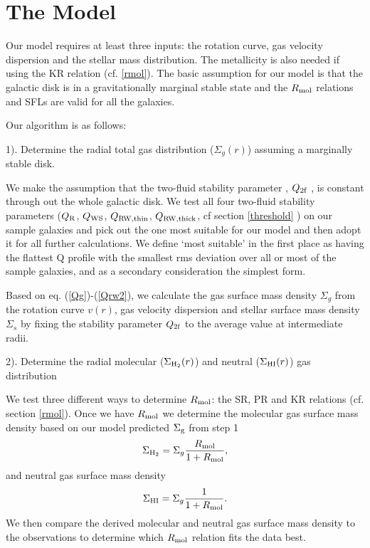 \documentclass[12pt,preprint]{aastex}
\begin{document}
\section{The Model}
\label{model}

Our model requires at least three inputs: the rotation curve, gas velocity dispersion and the stellar mass distribution. The metallicity is also needed if using the KR relation (cf. \ref{rmol}).  
 The basic assumption for our model is that the  galactic disk is in a gravitationally marginal stable state and the $R_{\rm mol}$ relations and SFLs are valid for all the galaxies.


 


Our algorithm is as follows:

1). Determine the radial total gas distribution  ($\Sigma_g(r)$) assuming a marginally stable disk.

We make the assumption that the two-fluid stability parameter 
, $  Q_{\rm 2f}$ , 
is constant through out the whole galactic disk. We test all  four two-fluid stability parameters ($Q_{\rm R}$, $Q_{\rm WS}$, $Q_{\rm RW,thin}$, $Q_{\rm RW,thick}$, 
 cf section \ref{threshold}
) on  our sample galaxies and pick out the one most suitable for our model and then adopt it for all further calculations. We define `most suitable' in the first place as having the flattest Q profile with the smallest rms deviation over all or most of the sample galaxies, and as a secondary consideration the simplest form.

Based on eq. (\ref{Qg})-(\ref{Qrw2}), we  calculate the gas surface mass density $\Sigma_g$ from the rotation curve $v(r)$, gas velocity dispersion and stellar surface mass density $\Sigma_s$ by fixing the stability parameter $Q_{\rm 2f}$ to the average value at intermediate radii. 


2). Determine the radial molecular ($\Sigma_{\rm H_2}(r)$) and  neutral ($\Sigma_{\rm HI}(r)$)  gas distribution  

We test three different ways to determine $R_{\rm mol}$: the SR, PR and KR relations (cf. section \ref{rmol}).
Once we have $R_{\rm mol}$ we  determine the molecular gas surface mass density 
 based on our model predicted $  \Sigma_{\rm g}$ from step 1
\begin{equation}
\Sigma_{\rm H_2}=\Sigma_g \frac{R_{\rm mol}}{1+R_{\rm mol}},
\end{equation}
and neutral gas surface mass density 
\begin{equation}
\Sigma_{\rm HI}=\Sigma_g \frac{1}{1+R_{\rm mol}}.
\end{equation}
We then compare the derived molecular and neutral gas surface mass density  to the observations to determine which $R_{\rm mol}$ relation fits the data best.
\end{document}
